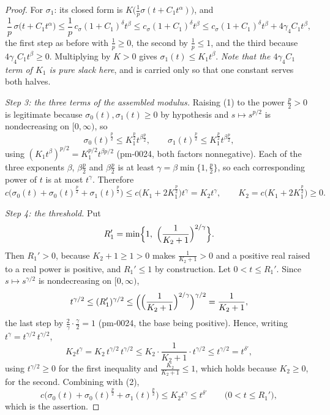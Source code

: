 \begin{proof}
For $\sigma_1$: its closed form is
$K\bigl(\frac1p\sigma(t+C_1t^{\alpha})\bigr)$, and
\[
\frac1p\,\sigma\bigl(t+C_1t^{\alpha}\bigr)
\le\frac1p\,c_\sigma(1+C_1)^{\delta}t^{\beta}
\le c_\sigma(1+C_1)^{\delta}t^{\beta}
\le c_\sigma(1+C_1)^{\delta}t^{\beta}+4\gamma_4C_1t^{\beta},
\]
the first step as before with $\frac1p\ge0$, the second by $\frac1p\le1$, and
the third because $4\gamma_4C_1t^{\beta}\ge0$.  Multiplying by $K>0$ gives
$\sigma_1(t)\le K_1t^{\beta}$.  \emph{Note that the $4\gamma_4C_1$ term of
$K_1$ is pure slack here}, and is carried only so that one constant serves both
halves.

\emph{Step 3: the three terms of the assembled modulus.}  Raising (1) to the
power $\frac p2>0$ is legitimate because $\sigma_0(t),\sigma_1(t)\ge0$ by
hypothesis and $s\mapsto s^{p/2}$ is nondecreasing on $[0,\infty)$, so
\[
\sigma_0(t)^{\frac p2}\le K_1^{\frac p2}t^{\beta\frac p2},
\qquad
\sigma_1(t)^{\frac p2}\le K_1^{\frac p2}t^{\beta\frac p2},
\]
using $(K_1t^{\beta})^{p/2}=K_1^{p/2}t^{\beta p/2}$ (pm-0024, both factors
nonnegative).  Each of the three exponents $\beta$, $\beta\frac p2$ and
$\beta\frac p2$ is at least $\gamma=\beta\min\{1,\frac p2\}$, so each
corresponding power of $t$ is at most $t^{\gamma}$.  Therefore
\[
c\bigl(\sigma_0(t)+\sigma_0(t)^{\frac p2}+\sigma_1(t)^{\frac p2}\bigr)
\le c\bigl(K_1+2K_1^{\frac p2}\bigr)t^{\gamma}=K_2t^{\gamma},
\qquad
K_2=c\bigl(K_1+2K_1^{\frac p2}\bigr)\ge0 .
\tag{2}
\]

\emph{Step 4: the threshold.}  Put
\[
R_1'=\min\Bigl\{1,\ \Bigl(\frac1{K_2+1}\Bigr)^{2/\gamma}\Bigr\} .
\]
Then $R_1'>0$, because $K_2+1\ge1>0$ makes $\frac1{K_2+1}>0$ and a positive
real raised to a real power is positive, and $R_1'\le1$ by construction.  Let
$0<t\le R_1'$.  Since $s\mapsto s^{\gamma/2}$ is nondecreasing on $[0,\infty)$,
\[
t^{\gamma/2}\le(R_1')^{\gamma/2}
\le\Bigl(\Bigl(\frac1{K_2+1}\Bigr)^{2/\gamma}\Bigr)^{\gamma/2}
=\frac1{K_2+1},
\]
the last step by $\frac2\gamma\cdot\frac\gamma2=1$ (pm-0024, the base being
positive).  Hence, writing $t^{\gamma}=t^{\gamma/2}\,t^{\gamma/2}$,
\[
K_2t^{\gamma}=K_2\,t^{\gamma/2}\,t^{\gamma/2}
\le K_2\cdot\frac1{K_2+1}\cdot t^{\gamma/2}
\le t^{\gamma/2}=t^{\delta'},
\]
using $t^{\gamma/2}\ge0$ for the first inequality and
$\frac{K_2}{K_2+1}\le1$, which holds because $K_2\ge0$, for the second.
Combining with (2),
\[
c\bigl(\sigma_0(t)+\sigma_0(t)^{\frac p2}+\sigma_1(t)^{\frac p2}\bigr)
\le K_2t^{\gamma}\le t^{\delta'}
\qquad\bigl(0<t\le R_1'\bigr),
\]
which is the assertion.
\end{proof}
